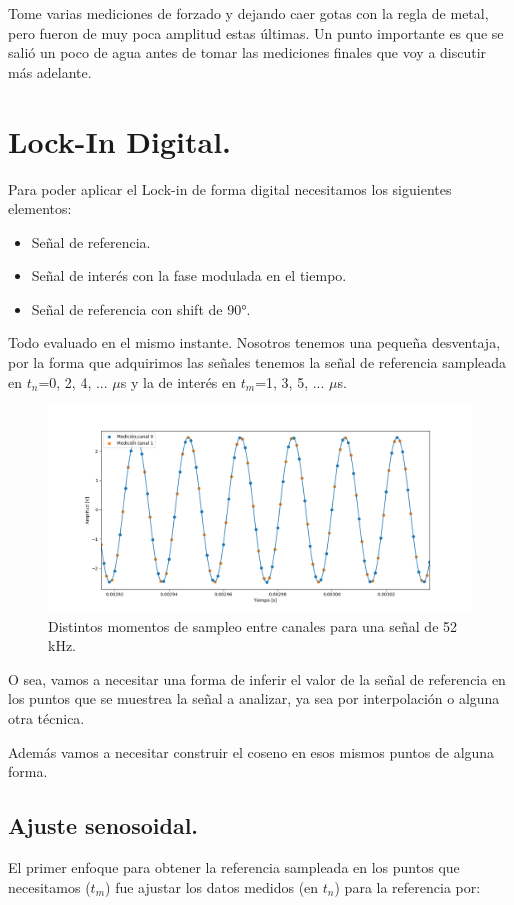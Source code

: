 Tome varias mediciones de forzado y dejando caer gotas con la regla de metal, pero fueron de muy poca amplitud estas últimas. Un punto importante es que se salió un poco de agua antes de tomar las mediciones finales que voy a discutir más adelante.

\section{Lock-In Digital.}
Para poder aplicar el Lock-in de forma digital necesitamos los siguientes elementos:

\begin{itemize}
	\item Señal de referencia.
	\item Señal de interés con la fase modulada en el tiempo.
	\item Señal de referencia con shift de 90°. 
\end{itemize}

Todo evaluado en el mismo instante. Nosotros tenemos una pequeña desventaja, por la forma que adquirimos las señales tenemos la señal de referencia sampleada en $t_n$=0, 2, 4, ... $\mu$s y la de interés en $t_m$=1, 3, 5, ... $\mu$s. 

\begin{figure}[th!]
	\centering
	\includegraphics[width=0.87\linewidth]{Figures/09_06_2025/Sampleos2}
	\caption{Distintos momentos de sampleo entre canales para una señal de 52 kHz.}
	\label{fig:sampleos2}
\end{figure}

O sea, vamos a necesitar una forma de inferir el valor de la señal de referencia en los puntos que se muestrea la señal a analizar, ya sea por interpolación o alguna otra técnica. 

Además vamos a necesitar construir el coseno en esos mismos puntos de alguna forma. %

\subsection*{Ajuste senosoidal.} 
El primer enfoque para obtener la referencia sampleada en los puntos que necesitamos ($t_m$) fue ajustar los datos medidos (en $t_n$) para la referencia por:

